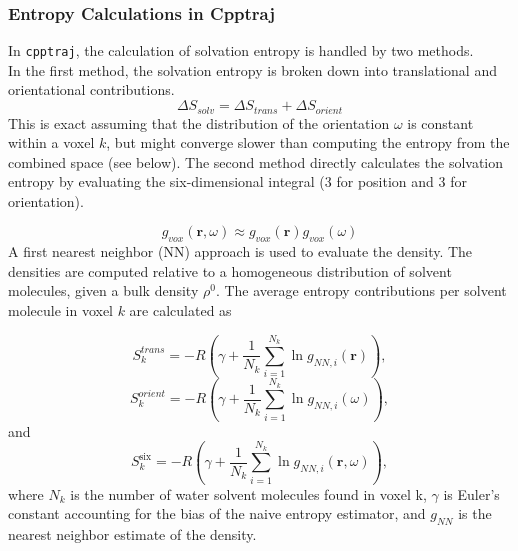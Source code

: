 \documentclass[9pt,tutorial]{livecoms}
\newcommand{\software}{\texttt}
\begin{document}
\subsubsection{Entropy Calculations in Cpptraj}
In \software{cpptraj}, the calculation of solvation entropy is handled by two methods.\\
In the first method, the solvation entropy is broken down into translational and orientational contributions.
\begin{equation}
\Delta S_\textit{solv} = \Delta S_\textit{trans} + \Delta S_\textit{orient}
\end{equation}
This is exact assuming that the distribution of the orientation $\omega$ is constant within a voxel $k$, but might converge slower than computing the entropy from the combined space (see below).
The second method directly calculates the solvation entropy by evaluating the six-dimensional integral (3 for position and 3 for orientation).

\begin{equation}
g_\textit{vox} \left( \textbf{r}, \omega \right) \approx g_\textit{vox}(\textbf{r}) g_\textit{vox}(\omega)
\end{equation}
A first nearest neighbor (NN) approach is used to evaluate the density.
The densities are computed relative to a homogeneous distribution of solvent molecules, given a bulk density $\rho^0$.
The average entropy contributions per solvent molecule in voxel $k$ are calculated as

\begin{equation}
	S_{k}^\textit{trans} = -R \left( \gamma + \frac{1}{N_\textit{k}} \sum _{i=1}^{N_k} \ln g_{NN, \textit{i}}(\textbf{r}) \right),
\end{equation}
\begin{equation}
S_{k}^\textit{orient} = -R \left( \gamma + \frac{1}{N_k} \sum _{i=1}^{N_k} \ln g_{NN, i}(\omega) \right)
,
\end{equation}
and
\begin{equation}
S_\textit{k}^\text{six} = -R \left( \gamma + \frac{1}{N_\textit{k}} \sum _{i=1}^{N_k} \ln g_{NN, \textit{i}}(\textbf{r},\omega) \right),
\end{equation}
where $N_\textit{k}$ is the number of water solvent molecules found in voxel k, $\gamma$ is Euler's constant accounting for the bias of the naive entropy estimator, and $g_\textit{NN}$ is the nearest neighbor estimate of the density.
\end{document}
